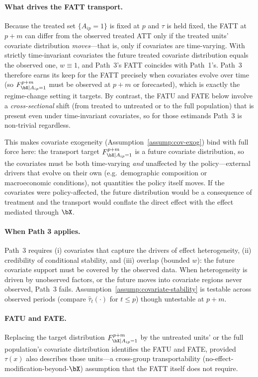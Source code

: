 \documentclass{article}
\begin{document}
\paragraph{What drives the FATT transport.} Because the treated set $\{A_{ip}=1\}$ is fixed at $p$ and $\tau$ is held fixed, the FATT at $p+m$ can differ from the observed treated ATT only if the treated units' covariate distribution \emph{moves}---that is, only if covariates are time-varying. With strictly time-invariant covariates the future treated covariate distribution equals the observed one, $w \equiv 1$, and Path~3's FATT coincides with Path~1's. Path~3 therefore earns its keep for the FATT precisely when covariates evolve over time (so $F^{p+m}_{\bX \mid A_{ip}=1}$ must be observed at $p+m$ or forecasted), which is exactly the regime-change setting it targets. By contrast, the FATU and FATE below involve a \emph{cross-sectional} shift (from treated to untreated or to the full population) that is present even under time-invariant covariates, so for those estimands Path~3 is non-trivial regardless.

This makes covariate exogeneity (Assumption~\ref{assump:cov-exog}) bind with full force here: the transport target $F^{p+m}_{\bX \mid A_{ip}=1}$ is a future covariate distribution, so the covariates must be both time-varying \emph{and} unaffected by the policy---external drivers that evolve on their own (e.g.\ demographic composition or macroeconomic conditions), not quantities the policy itself moves. If the covariates were policy-affected, the future distribution would be a consequence of treatment and the transport would conflate the direct effect with the effect mediated through $\bX$.

\paragraph{When Path 3 applies.} Path~3 requires (i) covariates that capture the drivers of effect heterogeneity, (ii) credibility of conditional stability, and (iii) overlap (bounded $w$): the future covariate support must be covered by the observed data. When heterogeneity is driven by unobserved factors, or the future moves into covariate regions never observed, Path~3 fails. Assumption~\ref{assump:covariate-stability} is testable across observed periods (compare $\widehat{\tau}_t(\cdot)$ for $t \leq p$) though untestable at $p+m$.

\paragraph{FATU and FATE.} Replacing the target distribution $F^{p+m}_{\bX \mid A_{ip}=1}$ by the untreated units' or the full population's covariate distribution identifies the FATU and FATE, provided $\tau(x)$ also describes those units---a cross-group transportability (no-effect-modification-beyond-$\bX$) assumption that the FATT itself does not require.
\end{document}
